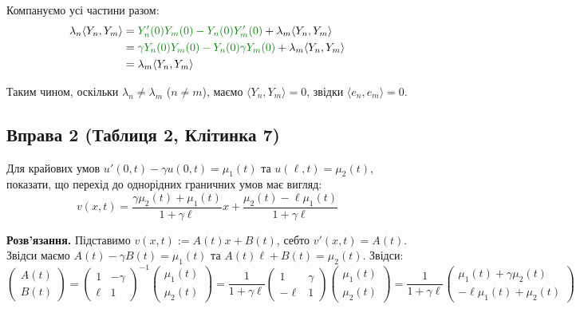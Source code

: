 \documentclass{hw_template}
\begin{document}
Компануємо усі частини разом:
\begin{align*}
    \lambda_n\langle Y_n, Y_m \rangle &= \textcolor{green!50!black}{Y_n'(0)Y_m(0) - Y_n(0)Y_m'(0)} + \lambda_m\langle Y_n, Y_m \rangle \\
    &= \textcolor{green!50!black}{\gamma Y_n(0)Y_m(0) - Y_n(0)\gamma Y_m(0)} + \lambda_m\langle Y_n, Y_m \rangle \\
    &= \lambda_m\langle Y_n, Y_m \rangle
\end{align*}

Таким чином, оскільки $\lambda_n \neq \lambda_m$ ($n \neq m$), маємо $\langle Y_n, Y_m
\rangle = 0$, звідки $\langle e_n, e_m \rangle = 0$.

\subsection{Вправа 2 (Таблиця 2, Клітинка 7)}

\begin{problem}
    Для крайових умов $u'(0,t)-\gamma u(0,t)=\mu_1(t)$ та $u(\ell,t)=\mu_2(t)$, показати, 
    що перехід до однорідних граничних умов має вигляд:
    \begin{equation*}
        v(x,t) = \frac{\gamma \mu_2(t) + \mu_1(t)}{1+\gamma \ell}x + \frac{\mu_2(t)-\ell \mu_1(t)}{1+\gamma \ell}
    \end{equation*}
\end{problem}

\textbf{Розв'язання.} Підставимо $v(x,t) := A(t)x+B(t)$, себто $v'(x,t) = A(t)$. Звідси маємо 
$A(t) - \gamma B(t) = \mu_1(t)$ та $A(t)\ell + B(t) = \mu_2(t)$. Звідси:
\begin{equation*}
    \begin{pmatrix}
        A(t) \\ B(t)
    \end{pmatrix} = \begin{pmatrix}
        1 & -\gamma \\
        \ell & 1
    \end{pmatrix}^{-1} \begin{pmatrix}
        \mu_1(t) \\ \mu_2(t)
    \end{pmatrix} = \frac{1}{1+\gamma \ell}\begin{pmatrix}
        1 & \gamma \\
        -\ell & 1
    \end{pmatrix} \begin{pmatrix}
        \mu_1(t) \\ \mu_2(t)
    \end{pmatrix} = \frac{1}{1+\gamma \ell}\begin{pmatrix}
        \mu_1(t) + \gamma \mu_2(t) \\ -\ell \mu_1(t) + \mu_2(t)
    \end{pmatrix}
\end{equation*}
\end{document}

